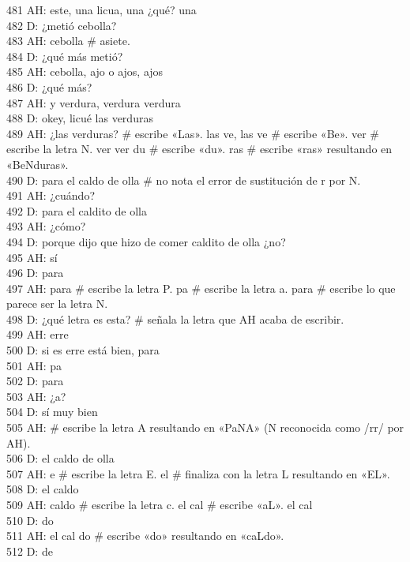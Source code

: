 481 AH: este, una licua, una ¿qué? una\\
482 D: ¿metió cebolla?\\
483 AH: cebolla \# asiete.\\
484 D: ¿qué más metió?\\
485 AH: cebolla, ajo o ajos, ajos\\
486 D: ¿qué más?\\
487 AH: y verdura, verdura verdura\\
488 D: okey, licué las verduras\\
489 AH: ¿las verduras? \# escribe «Las». las ve, las ve \# escribe «Be». ver \# escribe la letra N. ver ver du \# escribe «du». ras \# escribe «ras» resultando en «BeNduras».\\
490 D: para el caldo de olla \# no nota el error de sustitución de r por N.\\
491 AH: ¿cuándo?\\
492 D: para el caldito de olla\\
493 AH: ¿cómo?\\
494 D: porque dijo que hizo de comer caldito de olla ¿no?\\
495 AH: sí\\
496 D: para\\
497 AH: para \# escribe la letra P. pa \# escribe la letra a. para \# escribe lo que parece ser la letra N.\\
498 D: ¿qué letra es esta? \# señala la letra que AH acaba de escribir.\\
499 AH: erre\\
500 D: si es erre está bien, para\\
501 AH: pa\\
502 D: para\\
503 AH: ¿a?\\
504 D: sí muy bien\\
505 AH: \# escribe la letra A resultando en «PaNA» (N reconocida como /rr/ por AH).\\
506 D: el caldo de olla\\
507 AH: e \# escribe la letra E. el \# finaliza con la letra L resultando en «EL».\\
508 D: el caldo\\
509 AH: caldo \# escribe la letra c. el cal \# escribe «aL». el cal\\
510 D: do\\
511 AH: el cal do \# escribe «do» resultando en «caLdo».\\
512 D: de\\
